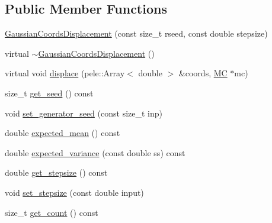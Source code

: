 \subsection*{\-Public \-Member \-Functions}
\begin{DoxyCompactItemize}
\item 
\hyperlink{classmcpele_1_1GaussianCoordsDisplacement_a693f5cd3743cca41cfae62ba5c8fa1b2}{\-Gaussian\-Coords\-Displacement} (const size\-\_\-t rseed, const double stepsize)
\item 
virtual \hyperlink{classmcpele_1_1GaussianCoordsDisplacement_a5629b7e1fc63a2208a188a7ed0461acc}{$\sim$\-Gaussian\-Coords\-Displacement} ()
\item 
virtual void \hyperlink{classmcpele_1_1GaussianCoordsDisplacement_a9855e838fb6d19c55be12dd108cfdb5b}{displace} (pele\-::\-Array$<$ double $>$ \&coords, \hyperlink{classmcpele_1_1MC}{\-M\-C} $\ast$mc)
\item 
size\-\_\-t \hyperlink{classmcpele_1_1GaussianCoordsDisplacement_acb65b915f740d1618ecc267c02fcd17b}{get\-\_\-seed} () const 
\item 
void \hyperlink{classmcpele_1_1GaussianCoordsDisplacement_adaefd98609344bb8a9744a9cee554ccc}{set\-\_\-generator\-\_\-seed} (const size\-\_\-t inp)
\item 
double \hyperlink{classmcpele_1_1GaussianCoordsDisplacement_a5f7da29b7bde371ff3971164f58ff3d9}{expected\-\_\-mean} () const 
\item 
double \hyperlink{classmcpele_1_1GaussianCoordsDisplacement_a225423c83abb6d91bedac92802961790}{expected\-\_\-variance} (const double ss) const 
\item 
double \hyperlink{classmcpele_1_1GaussianCoordsDisplacement_a87e64b4fed1cf85cc6e4ee13d6fde190}{get\-\_\-stepsize} () const 
\item 
void \hyperlink{classmcpele_1_1GaussianCoordsDisplacement_ab36a3671f18d4b2560cfc981a6bd6a2d}{set\-\_\-stepsize} (const double input)
\item 
size\-\_\-t \hyperlink{classmcpele_1_1GaussianCoordsDisplacement_ae5042527322a279d5a151ae7879d647e}{get\-\_\-count} () const 
\end{DoxyCompactItemize}
